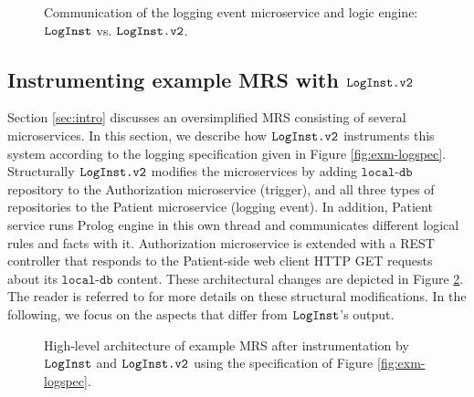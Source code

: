 \begin{figure} 
	\centering
	\caption{Communication of the logging event microservice and logic engine: $\texttt{LogInst}$ vs. $\texttt{LogInst.v2}$.}
	\label{fig:mrs-prolog-comm}
\end{figure}


\subsection{Instrumenting example MRS with $\texttt{LogInst.v2}$} \label{sec:cstudy}
Section \ref{sec:intro} discusses an oversimplified MRS consisting of several microservices. In this section, we describe how $\texttt{LogInst.v2}$ instruments this system according to the logging specification given in Figure \ref{fig:exm-logspec}. Structurally $\texttt{LogInst.v2}$ modifies the microservices by adding $\texttt{local-db}$ repository to the Authorization microservice (trigger), and all three types of repositories to the Patient microservice (logging event). In addition, Patient service runs Prolog engine in this own thread and communicates different logical rules and facts with it. Authorization microservice is extended with a REST controller that responds to the Patient-side web client HTTP GET requests about its $\texttt{local-db}$ content. These architectural changes are depicted in Figure \ref{fig:mrs-mics-target}. The reader is referred to \cite{stpsa21} for more details on these structural modifications. In the following, we focus on the aspects that differ from $\texttt{LogInst}$'s output. 

\begin{figure} 
	\centering
	\caption{High-level architecture of example MRS after instrumentation by $\texttt{LogInst}$ and $\texttt{LogInst.v2}$ using the specification of Figure \ref{fig:exm-logspec}.}
	\label{fig:mrs-mics-target}
\end{figure}


